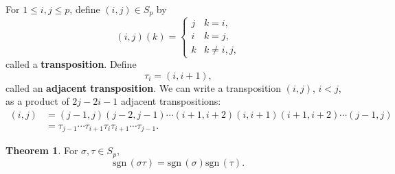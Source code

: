 \documentclass{article}
\newcommand{\sgn}{\mathrm{sgn}\,}
\theoremstyle{definition}
\newtheorem{theorem}{Theorem}
\theoremstyle{definition}
\begin{document}
For $1 \leq i, j \leq p$, define $(i,j) \in S_p$ by
\[
(i,j)(k) = \begin{cases}
j&k=i,\\
i&k=j,\\
k&k \neq i,j,
\end{cases}
\]
called a \textbf{transposition}.
Define
\[
\tau_i = (i,i+1),
\]
called an \textbf{adjacent transposition}.
We can write a transposition $(i,j)$, $i<j$, as a product of $2j-2i-1$ adjacent transpositions:
\begin{align*}
(i,j) & = (j-1,j)(j-2,j-1)\cdots(i+1,i+2)(i,i+1)(i+1,i+2)\cdots(j-1,j)\\
&=\tau_{j-1} \cdots \tau_{i+1} \tau_i \tau_{i+1} \cdots \tau_{j-1}.
\end{align*}

\begin{theorem}
For $\sigma,\tau \in S_p$,
\[
\sgn(\sigma \tau) = \sgn(\sigma) \sgn(\tau).
\]
\label{sgnhomo}
\end{theorem}
\end{document}
